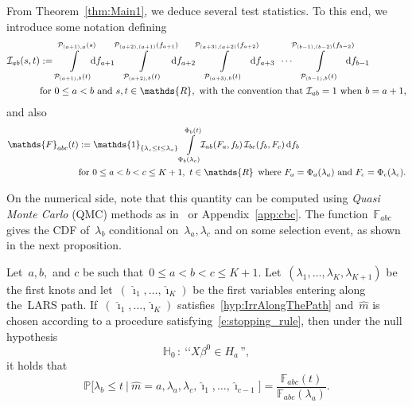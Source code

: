 \documentclass[final,numbib]{imaiai}%
\numberwithin{equation}{section}
\def\eq{\begin{equation}}
\def\qe{\end{equation}}
\def\cI{\mathcal{I}}
\def\cP{\mathcal{P}}
\def\bbF{\mathds{F}}
\def\bbP{\mathds{P}}
\def\bbR{\mathds{R}}
\renewcommand{\hat}{\widehat}
\def\\bUnif{\text{\bUnif}}
\newcommand{\<}{\langle}
\renewcommand{\>}{\rangle}
\newcommand{\1}{\mathds{1}}
\begin{document}
{\noindent
From Theorem~\ref{thm:Main1}, we deduce several test statistics.
To this end, we introduce some notation defining
\begin{align}
\label{fun:iabc}
\cI_{ab}(s,t)&:=
\displaystyle
\int\displaylimits_{\cP_{{(a+1)},b}(t)}^{\cP_{{(a+1)},a}(s)}\!\!\!\mathrm df_{a+1}\!\!\!
\int\displaylimits_{\cP_{{(a+2)},b}(t)}^{\cP_{(a+2),(a+1)}(f_{a+1})}\!\!\!\!\mathrm df_{a+2}\!\!\!
\int\displaylimits_{\cP_{{(a+3)},b}(t)}^{\cP_{(a+3),(a+2)}(f_{a+2})}\!\!\!\!\!\mathrm df_{a+3}\,\,\,
\cdots
\!\!\!\int\displaylimits_{\cP_{{(b-1)},b}(t)}^{\cP_{(b-1),(b-2)}(f_{b-2})}\!\!\!\!\!\mathrm df_{b-1}
\\
&\text{for }0\leq a<b\ \text{and }s,t\in\bbR,\text{ with the convention that }\cI_{ab}=1\text{ when }b=a+1,
\notag
\end{align}
\noindent
and also
\begin{align}
\label{fun:fabc}
\bbF_{abc}(t)&:=
\1_{\{\lambda_c\leq t\leq \lambda_a\}}
\displaystyle
\int\displaylimits_{\Phi_{b}(\lambda_{c})}^{\Phi_{b}(t)}\!\!\cI_{ab}(%
{F_a},f_b)\,\cI_{bc}(f_b,
{F_c})\,\mathrm df_b\\
\notag
&\text{for }0\leq a<b<c\leq K+1,\ t\in\bbR\, \text{ where }F_a=\Phi_{a}(\lambda_a)\text{ and }F_c=\Phi_{c}(\lambda_c).
\end{align}

\begin{remark}
On the numerical side, note that this quantity can be computed using {\it Quasi Monte Carlo} (QMC) methods as in~\cite[Chapter 5.1]{genz2009computation} or Appendix~\ref{app:cbc}.
The function~$\bbF_{abc}$ gives the CDF of~$\lambda_b$ conditional on~$\lambda_a,\lambda_c$ and on some selection event, as shown in the next proposition.
\end{remark}


\begin{proposition}
\label{prop:fabc}
Let~$a, b,$ and $c$ be such that~$0\leq a<b<c\leq K+1$.
Let~$(\lambda_1,\ldots, \lambda_K,\lambda_{K+1})$ be the first knots and let~$(\,\hat \imath_1,\ldots, \hat \imath_K)$ be the first variables entering along the~LARS path.
If~$(\,\hat \imath_1,\ldots, \hat \imath_K)$ satisfies~\eqref{hyp:IrrAlongThePath} and~$\hat m$ is chosen according to a procedure satisfying~{\eqref{e:stopping_rule}}, then under the null hypothesis
\[
\mathds H_0\,:\ \text{‘‘}X\beta^0\in H_{a}\,\text{''},
\] 
it holds that
\eq
\label{eqFabc}
\bbP\big[\lambda_b\leq t\ |\ \hat m=a,\lambda_a,\lambda_c, \hat \imath_{1}, \ldots,\hat \imath_{c-1}\big]=\frac{\bbF_{abc}(t)}{\bbF_{abc}(\lambda_a)}.
\qe
\end{proposition}

}
\end{document}

